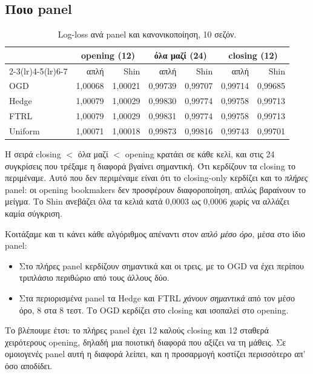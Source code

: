 \documentclass[11pt,a4paper]{article}
\renewcommand{\_}{\oldunderscore\allowbreak}
\begin{document}
\subsection*{Ποιο panel}

\begin{table}[H]
\centering
\small
\begin{tabular}{@{}lrrrrrr@{}}
\toprule
& \multicolumn{2}{c}{\textbf{opening} (12)} & \multicolumn{2}{c}{\textbf{όλα μαζί} (24)} & \multicolumn{2}{c}{\textbf{closing} (12)} \\
\cmidrule(lr){2-3}\cmidrule(lr){4-5}\cmidrule(lr){6-7}
& απλή & Shin & απλή & Shin & απλή & Shin \\
\midrule
OGD     & 1,00068 & 1,00021 & 0,99739 & 0,99707 & 0,99714 & 0,99685 \\
Hedge   & 1,00079 & 1,00029 & 0,99830 & 0,99774 & 0,99758 & 0,99713 \\
FTRL    & 1,00079 & 1,00029 & 0,99831 & 0,99774 & 0,99758 & 0,99713 \\
Uniform & 1,00071 & 1,00018 & 0,99873 & 0,99816 & 0,99743 & 0,99701 \\
\bottomrule
\end{tabular}
\caption{Log-loss ανά panel και κανονικοποίηση, 10 σεζόν.}
\end{table}

Η σειρά closing $<$ όλα μαζί $<$ opening κρατάει σε κάθε κελί, και στις 24 συγκρίσεις που
τρέξαμε η διαφορά βγαίνει σημαντική. Ότι κερδίζουν τα closing το περιμέναμε. Αυτό που δεν
περιμέναμε είναι ότι το closing-only κερδίζει και το \emph{πλήρες} panel: οι opening
bookmakers δεν προσφέρουν διαφοροποίηση, απλώς βαραίνουν το μείγμα. Το Shin ανεβάζει όλα τα
κελιά κατά 0,0003 ως 0,0006 χωρίς να αλλάζει καμία σύγκριση.

Κοιτάξαμε και τι κάνει κάθε αλγόριθμος απέναντι στον \emph{απλό μέσο όρο}, μέσα στο ίδιο
panel:

\begin{itemize}
  \item Στο πλήρες panel κερδίζουν σημαντικά και οι τρεις, με το OGD να έχει περίπου
        τριπλάσιο περιθώριο από τους άλλους δύο.
  \item Στα περιορισμένα panel τα Hedge και FTRL \emph{χάνουν σημαντικά} από τον μέσο όρο,
        8 στα 8 τεστ. Το OGD κερδίζει στο closing και ισοπαλεί στο opening.
\end{itemize}

Το βλέπουμε έτσι: το πλήρες panel έχει 12 καλούς closing και 12 σταθερά χειρότερους opening,
δηλαδή μια ποιοτική διαφορά που αξίζει να τη μάθεις. Σε ομοιογενές panel αυτή η διαφορά
λείπει, και η προσαρμογή κοστίζει περισσότερο απ' όσο αποδίδει.
\end{document}
